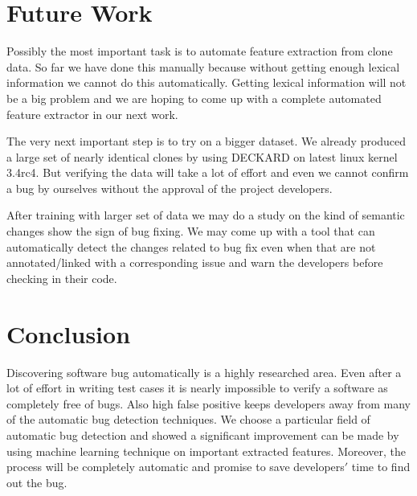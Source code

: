 \documentclass[11pt]{article}
\begin{document}
\section{Future Work}
Possibly the most important task is to automate feature extraction from clone data. So far we have done this manually because without getting enough lexical information we cannot do this automatically. Getting lexical information will not be a big problem and we are hoping to come up with a complete automated feature extractor in our next work.

\vspace{10pt}
\noindent 
The very next important step is to try on a bigger dataset. We already produced a large set of nearly identical clones by using DECKARD on latest linux kernel 3.4rc4. But verifying the data will take a lot of effort and even we cannot confirm a bug by ourselves without the approval of the project developers.

\vspace{10pt}
\noindent
After training with larger set of data we may do a study on the kind of semantic changes show the sign of bug fixing. We may come up with a tool that can automatically detect the changes related to bug fix even when that are not annotated/linked with a corresponding issue and warn the developers before checking in their code.

\section{Conclusion}
Discovering software bug automatically is a highly researched area. Even after a lot of effort in writing test cases it is nearly impossible to verify a software as completely free of bugs. Also high false positive keeps developers away from many of the automatic bug detection techniques. We choose a particular field of automatic bug detection and showed a significant improvement can be made by using machine learning technique on important extracted features. Moreover, the process will be completely automatic and promise to save developers$'$ time to find out the bug.



\end{document}
